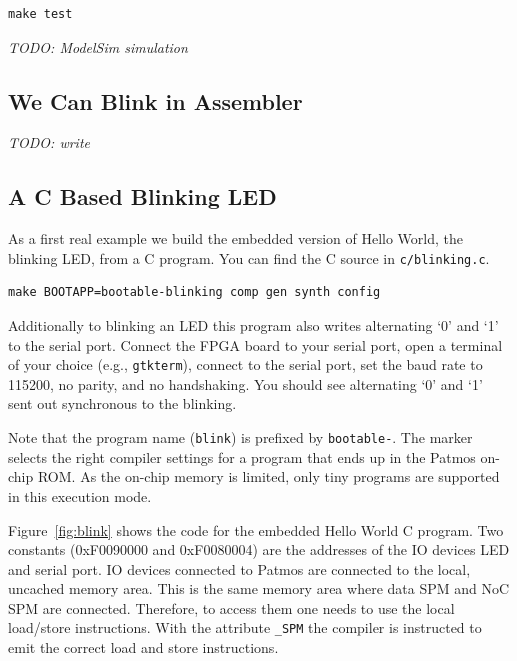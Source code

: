 \documentclass[a4paper,fontsize=10pt,twoside,DIV15,BCOR12mm,headinclude=true,footinclude=false,pagesize,bibtotoc]{scrbook}
\newcommand{\code}[1]{{\texttt{#1}}}
\newcommand{\todo}[1]{{\emph{TODO: #1}}}
\begin{document}
\begin{verbatim}
make test
\end{verbatim}


\todo{ModelSim simulation}

\subsection{We Can Blink in Assembler}

\todo{write}

\subsection{A C Based Blinking LED}

As a first real example we build the embedded version of Hello World, the
blinking LED, from a C program. You can find the C source in \code{c/blinking.c}.

\begin{verbatim}
make BOOTAPP=bootable-blinking comp gen synth config
\end{verbatim}

Additionally to blinking an LED this program also writes alternating `0' and `1'
to the serial port. Connect the FPGA board to your serial port,
open a terminal of your choice (e.g., \code{gtkterm}), connect to the serial port,
set the baud rate to 115200, no parity, and no handshaking.
You should see alternating `0' and `1' sent out synchronous to the blinking.

Note that the program name (\code{blink}) is prefixed by \code{bootable-}.
The marker selects the right compiler settings for a program that ends up in
the Patmos on-chip ROM. As the on-chip memory is limited, only tiny programs
are supported in this execution mode.

Figure~\ref{fig:blink} shows the code for the embedded Hello World
C program. Two constants (0xF0090000 and 0xF0080004) are the addresses
of the IO devices LED and serial port. IO devices connected to Patmos are
connected to the local, uncached memory area. This is the same memory
area where data SPM and NoC SPM are connected. Therefore, to access them
one needs to use the local load/store instructions. With the attribute \code{\_SPM}
the compiler is instructed to emit the correct load and store instructions.
\end{document}
